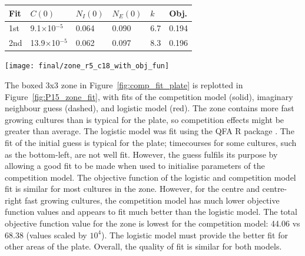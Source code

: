 \begin{center}
  \begin{tabular}{l l l l l l}
    \hline
    Fit     & \(C(0)\)                    & \(N_{I}(0)\) & \(N_{E}(0)\) & \(k\) & Obj.\\
    \hline
    1st     & 9.1\(\times\)10\(^{-5}\)    & 0.064      & 0.090       & 6.7  & 0.194 \\
    2nd     & 13.9\(\times\)10\(^{-5}\)   & 0.062      & 0.097       & 8.3  & 0.196 \\
    \hline
  \end{tabular}
  \label{tab:P15_best_fit_params}
\end{center}

\graphicspath{{images/p15_fits/}}
\begin{Figure}
  \centering
  \texttt{[image: final/zone\_r5\_c18\_with\_obj\_fun]}
  \label{fig:P15_zone_fit}
\end{Figure}

The boxed 3x3 zone in Figure~\ref{fig:comp_fit_plate} is replotted in
Figure~\ref{fig:P15_zone_fit}, with fits of the competition model
(solid), imaginary neighbour guess (dashed), and logistic model
(red). The zone contains more fast growing cultures than is typical
for the plate, so competition effects might be greater than
average. The logistic model was fit using the QFA R package
\citep{qfa2016}. The fit of the initial guess is typical for the
plate; timecourses for some cultures, such as the bottom-left, are not
well fit. However, the guess fulfils its purpose by allowing a good
fit to be made when used to initialise parameters of the competition
model. The objective function of the logistic and competition model
fit is similar for most cultures in the zone. However, for the centre
and centre-right fast growing cultures, the competition model has much
lower objective function values and appears to fit much better than
the logistic model. The total objective function value for the zone is
lowest for the competition model: 44.06 vs 68.38 (values scaled by
\(10^{4}\)). The logistic model must provide the better fit for other
areas of the plate. Overall, the quality of fit is similar for both
models.

